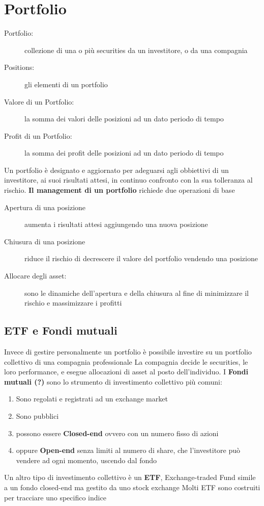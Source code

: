 \documentclass[a4paper,11pt]{report}
\begin{document}
{%
\section{Portfolio}
\begin{description}
	\item[Portfolio:] collezione di una o più securities da un investitore, o da una compagnia
	\item[Positions:] gli elementi di un portfolio
	\item[Valore di un Portfolio:] la somma dei valori delle posizioni ad un dato periodo di tempo
	\item[Profit di un Portfolio:] la somma dei profit delle posizioni ad un dato periodo di tempo
\end{description}
	Un portfolio è designato e aggiornato per adeguarsi agli obbiettivi di un investitore, ai suoi risultati attesi, in continuo 			confronto con la sua tolleranza al rischio. \newline
	\textbf{Il management di un portfolio} richiede due operazioni di base
\begin{description}
	\item[Apertura di una posizione] aumenta i risultati attesi aggiungendo una nuova posizione
	\item[Chiusura di una posizione] riduce il rischio di decrescere il valore del portfolio vendendo una posizione
	\item[Allocare degli asset:] sono le dinamiche dell'apertura e della chiusura al fine di minimizzare il rischio e massimizzare i 		profitti
\end{description}
\subsection{ETF e Fondi mutuali}
	Invece di gestire personalmente un portfolio è possibile investire su un portfolio collettivo di una compagnia professionale \newline
	La compagnia decide le securities, le loro performance, e esegue allocazioni di asset al posto dell'individuo. \newline
	I \textbf{Fondi mutuali (?)} sono lo strumento di investimento collettivo più comuni:
\begin{enumerate} %
	\item Sono regolati e registrati ad un exchange market	 
	\item Sono pubblici
	\item possono essere \textbf{Closed-end} ovvero con un numero fisso di azioni
	\item oppure \textbf{Open-end} senza limiti al numero di share, che l'investitore può vendere ad ogni momento, uscendo dal 	fondo
\end{enumerate}
	Un altro tipo di investimento collettivo è un \textbf{ETF}, Exchange-traded Fund \newline
	simile a un fondo closed-end ma gestito da uno stock exchange \newline
	Molti ETF sono costruiti per tracciare uno specifico indice %

}
\end{document}

